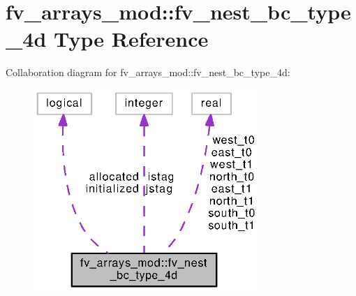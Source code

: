 \section{fv\-\_\-arrays\-\_\-mod\-:\-:fv\-\_\-nest\-\_\-bc\-\_\-type\-\_\-4d Type Reference}
\label{structfv__arrays__mod_1_1fv__nest__bc__type__4d}


Collaboration diagram for fv\-\_\-arrays\-\_\-mod\-:\-:fv\-\_\-nest\-\_\-bc\-\_\-type\-\_\-4d\-:
\nopagebreak
\begin{figure}[H]
\begin{center}
\leavevmode
\includegraphics[width=241pt]{structfv__arrays__mod_1_1fv__nest__bc__type__4d__coll__graph}
\end{center}
\end{figure}
